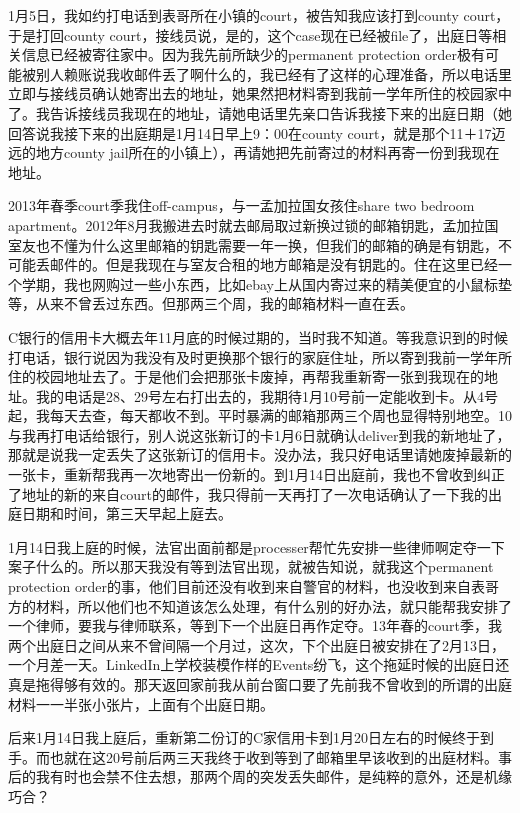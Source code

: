 \documentclass[12pt]{book}
\begin{document}
1月5日，我如约打电话到表哥所在小镇的court，被告知我应该打到county court，于是打回county court，接线员说，是的，这个case现在已经被file了，出庭日等相关信息已经被寄往家中。因为我先前所缺少的permanent protection order极有可能被别人赖账说我收邮件丢了啊什么的，我已经有了这样的心理准备，所以电话里立即与接线员确认她寄出去的地址，她果然把材料寄到我前一学年所住的校园家中了。我告诉接线员我现在的地址，请她电话里先亲口告诉我接下来的出庭日期（她回答说我接下来的出庭期是1月14日早上9：00在county court，就是那个11＋17迈远的地方county jail所在的小镇上），再请她把先前寄过的材料再寄一份到我现在地址。

2013年春季court季我住off-campus，与一孟加拉国女孩住share two bedroom apartment。2012年8月我搬进去时就去邮局取过新换过锁的邮箱钥匙，孟加拉国室友也不懂为什么这里邮箱的钥匙需要一年一换，但我们的邮箱的确是有钥匙，不可能丢邮件的。但是我现在与室友合租的地方邮箱是没有钥匙的。住在这里已经一个学期，我也网购过一些小东西，比如ebay上从国内寄过来的精美便宜的小鼠标垫等，从来不曾丢过东西。但那两三个周，我的邮箱材料一直在丢。

C银行的信用卡大概去年11月底的时候过期的，当时我不知道。等我意识到的时候打电话，银行说因为我没有及时更换那个银行的家庭住址，所以寄到我前一学年所住的校园地址去了。于是他们会把那张卡废掉，再帮我重新寄一张到我现在的地址。我的电话是28、29号左右打出去的，我期待1月10号前一定能收到卡。从4号起，我每天去查，每天都收不到。平时暴满的邮箱那两三个周也显得特别地空。10与我再打电话给银行，别人说这张新订的卡1月6日就确认deliver到我的新地址了，那就是说我一定丢失了这张新订的信用卡。没办法，我只好电话里请她废掉最新的一张卡，重新帮我再一次地寄出一份新的。到1月14日出庭前，我也不曾收到纠正了地址的新的来自court的邮件，我只得前一天再打了一次电话确认了一下我的出庭日期和时间，第三天早起上庭去。

1月14日我上庭的时候，法官出面前都是processer帮忙先安排一些律师啊定夺一下案子什么的。所以那天我没有等到法官出现，就被告知说，就我这个permanent protection order的事，他们目前还没有收到来自警官的材料，也没收到来自表哥方的材料，所以他们也不知道该怎么处理，有什么别的好办法，就只能帮我安排了一个律师，要我与律师联系，等到下一个出庭日再作定夺。13年春的court季，我两个出庭日之间从来不曾间隔一个月过，这次，下个出庭日被安排在了2月13日，一个月差一天。LinkedIn上学校装模作样的Events纷飞，这个拖延时候的出庭日还真是拖得够有效的。那天返回家前我从前台窗口要了先前我不曾收到的所谓的出庭材料一一半张小张片，上面有个出庭日期。

后来1月14日我上庭后，重新第二份订的C家信用卡到1月20日左右的时候终于到手。而也就在这20号前后两三天我终于收到等到了邮箱里早该收到的出庭材料。事后的我有时也会禁不住去想，那两个周的突发丢失邮件，是纯粹的意外，还是机缘巧合？
\end{document}
